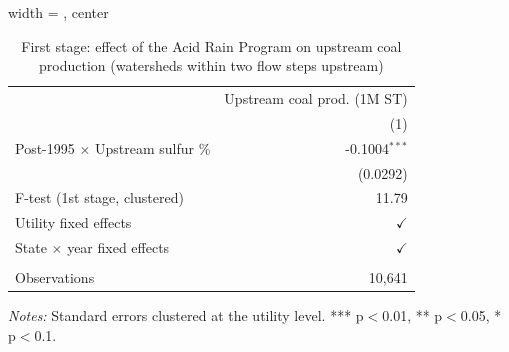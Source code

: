 
\begin{table}[htbp]
   
   \caption{\label{tab:fs_dwnstrm_minevio_ivsum_k2annprod} First stage: effect of the Acid Rain Program on upstream coal production (watersheds within two flow steps upstream)}
   \bigskip
   
   \centering
   
   \begin{adjustbox}{width = \textwidth, center}
      
      
      \begin{tabular}{lr}
         \toprule
         
                                                 & Upstream coal prod. (1M ST)\\  
         
                                                 & (1)\\  
         
         \midrule 
         Post-1995 $\times$ Upstream sulfur \%   & -0.1004$^{***}$\\   
                                                 & (0.0292)\\   
         
         F-test (1st stage, clustered)           & 11.79\\  
         
         Utility fixed effects                   & $\checkmark$\\   
         
         State $\times$ year fixed effects       & $\checkmark$\\   
         
          \\
         
         Observations                            & 10,641\\  
         
         \bottomrule
         
      \end{tabular}
      
      
      
   \end{adjustbox}
      {\tiny\linespread{1}\selectfont \par \raggedright 
   \textit{Notes:} Standard errors clustered at the utility level. *** p$<$0.01, ** p$<$0.05, * p$<$0.1.}
   
\end{table}


